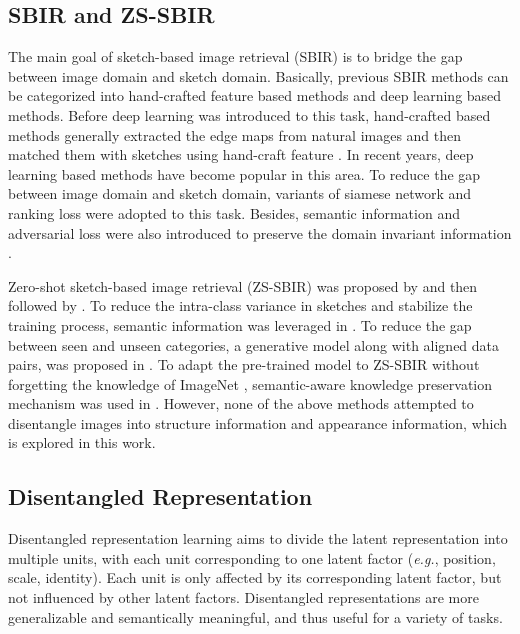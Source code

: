 \documentclass[10pt,twocolumn,letterpaper]{article}
\begin{document}
\subsection{SBIR and ZS-SBIR}
The main goal of sketch-based image retrieval (SBIR) is to bridge the gap between image domain and sketch domain. Basically, previous SBIR methods can be categorized into hand-crafted feature based methods and deep learning based methods. Before deep learning was introduced to this task, hand-crafted based methods generally extracted the edge maps from natural images and then matched them with sketches using hand-craft feature \cite{saavedra2015sketch, hu2013performance, eitz2010sketch, hu2011bag, eitz2010evaluation}. In recent years, deep learning based methods have become popular in this area. To reduce the gap between image domain and sketch domain, variants of siamese network \cite{qi2016sketch, sangkloy2016sketchy, song2017deep} and ranking loss \cite{chopra2005learning, sangkloy2016sketchy} were adopted to this task. Besides, semantic information and adversarial loss were also introduced to preserve the domain invariant information \cite{chen2018deep}.

Zero-shot sketch-based image retrieval (ZS-SBIR) was proposed by \cite{shen2018zero} and then followed by \cite{yelamarthi2018zero, xu2019semantic, wang2019stacked, liu2019semantic, dutta2019semantically}. To reduce the intra-class variance in sketches and stabilize the training process, semantic information was leveraged in \cite{wang2019stacked, shen2018zero, xu2019semantic, dutta2019semantically}. To reduce the gap between seen and unseen categories, a generative model along with aligned data pairs, was proposed in \cite{yelamarthi2018zero}. To adapt the pre-trained model to ZS-SBIR without forgetting the knowledge of ImageNet \cite{deng2009imagenet}, semantic-aware knowledge preservation mechanism was used in \cite{liu2019semantic}. However, none of the above methods attempted to disentangle images into structure information and appearance information, which is explored in this work.

\subsection{Disentangled Representation}
Disentangled representation learning aims to divide the latent representation into multiple units, with each unit corresponding to one latent factor (\emph{e.g.}, position, scale, identity). Each unit is only affected by its corresponding latent factor, but not influenced by other latent factors. Disentangled representations are more generalizable and semantically meaningful, and thus useful for a variety of tasks.
\end{document}
